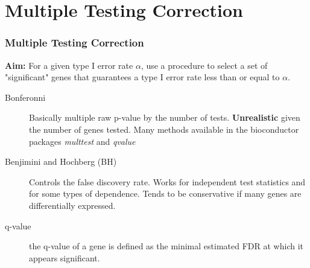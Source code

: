 \documentclass[pdf]{beamer}
\begin{document}
\section{Multiple Testing Correction}
\begin{frame}
  \frametitle{Multiple Testing Correction}
  \textbf{Aim:} For a given type I error rate $\alpha$, use a procedure to select a set of "significant" genes that guarantees a type I error rate less than or equal to $\alpha$. 
  \begin{description}
  \item[Bonferonni] Basically multiple raw p-value by the number of tests. \textbf{Unrealistic} given the number of genes tested.
  Many methods available in the bioconductor packages \textit{multtest} and \textit{qvalue}
  \item [Benjimini and Hochberg (BH)] Controls the false discovery rate. Works for independent test statistics and for some types of dependence. Tends to be conservative if many genes are differentially expressed.  
  \item [q-value] the q-value of a gene is defined as the minimal estimated FDR at which it appears significant.
  \end{description}
\end{frame}

\end{document}
